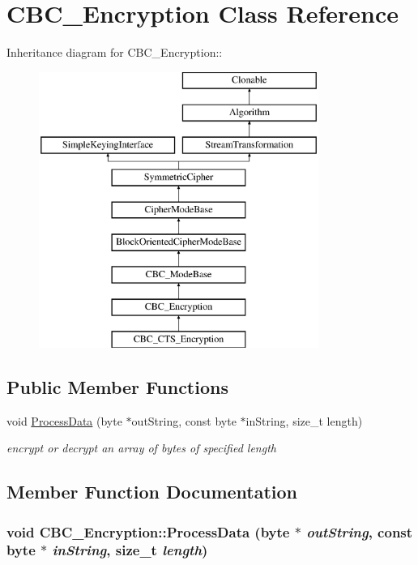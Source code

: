 \hypertarget{class_c_b_c___encryption}{
\section{CBC\_\-Encryption Class Reference}
\label{class_c_b_c___encryption}
}
Inheritance diagram for CBC\_\-Encryption::\begin{figure}[H]
\begin{center}
\leavevmode
\includegraphics[height=9cm]{class_c_b_c___encryption}
\end{center}
\end{figure}
\subsection*{Public Member Functions}
\begin{DoxyCompactItemize}
\item 
void \hyperlink{class_c_b_c___encryption_ad4efdd9fd6d832b234771754cd51d20a}{ProcessData} (byte $\ast$outString, const byte $\ast$inString, size\_\-t length)
\begin{DoxyCompactList}\small\item\em encrypt or decrypt an array of bytes of specified length \item\end{DoxyCompactList}\end{DoxyCompactItemize}


\subsection{Member Function Documentation}
\hypertarget{class_c_b_c___encryption_ad4efdd9fd6d832b234771754cd51d20a}{
\subsubsection[{ProcessData}]{\setlength{\rightskip}{0pt plus 5cm}void CBC\_\-Encryption::ProcessData (byte $\ast$ {\em outString}, \/  const byte $\ast$ {\em inString}, \/  size\_\-t {\em length})}}
\label{class_c_b_c___encryption_ad4efdd9fd6d832b234771754cd51d20a}



